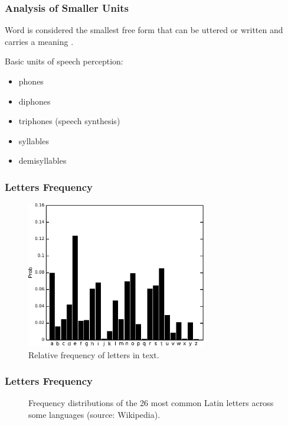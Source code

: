 \documentclass{beamer}
\begin{document}
\frame
{
  \frametitle{Analysis of Smaller Units}
  Word is considered the smallest free form that can be uttered or written and carries a meaning \citep{bloomfield1926}.
  
  \vspace{1cm}
  Basic units of speech perception:
  \begin{itemize}
  \item phones \citep{pisoni1982}
  \item diphones \citep{klatt1979}
  \item triphones (speech synthesis)
  \item syllables \citep{studdert1976}
  \item demisyllables \citep{fujimura1978} 
  \end{itemize}
} 

\frame
{
  \frametitle{Letters Frequency}
  \begin{figure}[h!]
  \centering
  \includegraphics[width=0.7\textwidth]{images/ulysses_letters_prob_bargraph.pdf}
  \caption{Relative frequency of letters in text.}
  \label{fig:ulysses_letters_prob_bargraph}
  \end{figure} 
}


\frame
{
  \frametitle{Letters Frequency}
  \begin{figure}[h!]
  \caption{Frequency distributions of the 26 most common Latin letters across some languages (source: Wikipedia).}
  \label{fig:letters_freq}
  \end{figure} 
}
\end{document}
